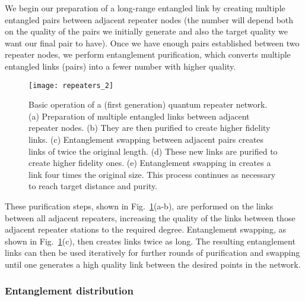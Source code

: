 We begin our preparation of a long-range entangled link by creating multiple entangled pairs between adjacent repeater nodes (the number will depend both on the quality of the pairs we initially generate and also the target quality we want our final pair to have). Once we have enough pairs established between two repeater nodes, we perform entanglement purification, which converts multiple entangled links (pairs) into a fewer number with higher quality. 
\begin{figure}[!htb]
\texttt{[image: repeaters\_2]}
\caption{Basic operation of a (first generation) quantum repeater network. (a) Preparation of multiple entangled links between adjacent repeater nodes. (b) They are then purified to create higher fidelity links. (c) Entanglement swapping between adjacent pairs creates links of twice the original length. (d) These new links are purified to create higher fidelity ones. (e) Entanglement swapping in creates a link four times the original size. This process continues as necessary to reach target distance and purity.} 
\label{fig:repeaters_2}
\end{figure} 
These purification steps, shown in Fig.~\ref{fig:repeaters_2}(a-b), are performed on the links between all adjacent repeaters, increasing the quality of the links between those adjacent repeater stations to the required degree. Entanglement swapping, as shown in Fig.~\ref{fig:repeaters_2}(c), then creates links twice as long. The resulting entanglement links can then be used iteratively for further rounds of purification and swapping until one generates a high quality link between the desired points in the network. 

\subsubsection{Entanglement distribution}\label{sec:reps_ent_dist}

